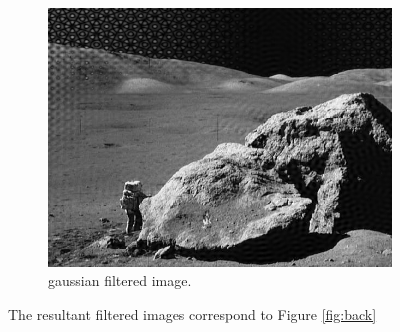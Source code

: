\documentclass[14pt]{article}
\begin{document}
\begin{figure}[hbt!]
\begin{subfigure}[b]{0.3\linewidth}
				\includegraphics[width=\linewidth]{gaussian_image.png}
				\caption{gaussian filtered image.}
			\end{subfigure}
	\caption{The resultant filtered images correspond to Figure \ref{fig:back}}
		\end{figure}
	
\end{document}
